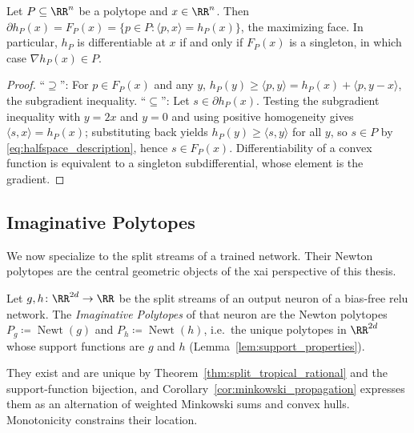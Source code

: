 \begin{proposition}\label{prop:subdifferential_face}
Let $P \subseteq \RR^n$ be a polytope and $x \in \RR^n$. Then $\partial h_P(x) = F_P(x) = \{ p \in P : \langle p, x \rangle = h_P(x) \}$, the maximizing face. In particular, $h_P$ is differentiable at $x$ if and only if $F_P(x)$ is a singleton, in which case $\nabla h_P(x) \in P$.
\hfill{}
\end{proposition}

\begin{proof}
``$\supseteq$'': For $p \in F_P(x)$ and any $y$, $h_P(y) \ge \langle p, y \rangle = h_P(x) + \langle p, y - x \rangle$, the subgradient inequality. ``$\subseteq$'': Let $s \in \partial h_P(x)$. Testing the subgradient inequality with $y = 2x$ and $y = 0$ and using positive homogeneity gives $\langle s, x \rangle = h_P(x)$; substituting back yields $h_P(y) \ge \langle s, y \rangle$ for all $y$, so $s \in P$ by \eqref{eq:halfspace_description}, hence $s \in F_P(x)$. Differentiability of a convex function is equivalent to a singleton subdifferential, whose element is the gradient.
\end{proof}

\subsection{Imaginative Polytopes}\label{sec:imaginative_polytopes}

We now specialize to the split streams of a trained network. Their Newton polytopes are the central geometric objects of the \ac{xai} perspective of this thesis.

\begin{definition}\label{def:imaginative_polytopes}
Let $g, h \colon \RR^{2d} \to \RR$ be the split streams of an output neuron of a bias-free \ac{relu} network. The \emph{Imaginative Polytopes} of that neuron are the Newton polytopes $P_g \coloneqq \operatorname{Newt}(g)$ and $P_h \coloneqq \operatorname{Newt}(h)$, i.e.\ the unique polytopes in $\RR^{2d}$ whose support functions are $g$ and $h$ (Lemma~\ref{lem:support_properties}).
\end{definition}

They exist and are unique by Theorem~\ref{thm:split_tropical_rational} and the support-function bijection, and Corollary~\ref{cor:minkowski_propagation} expresses them as an alternation of weighted Minkowski sums and convex hulls. Monotonicity constrains their location.

